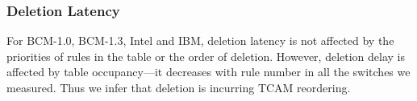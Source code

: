 \subsubsection{Deletion Latency}

For BCM-1.0, BCM-1.3, Intel and IBM, deletion latency is not affected
by the priorities of rules in the table or the order of deletion.
However, deletion delay is affected by table occupancy---it decreases with rule number 
in all the switches we measured. Thus we infer that deletion is incurring TCAM reordering.

